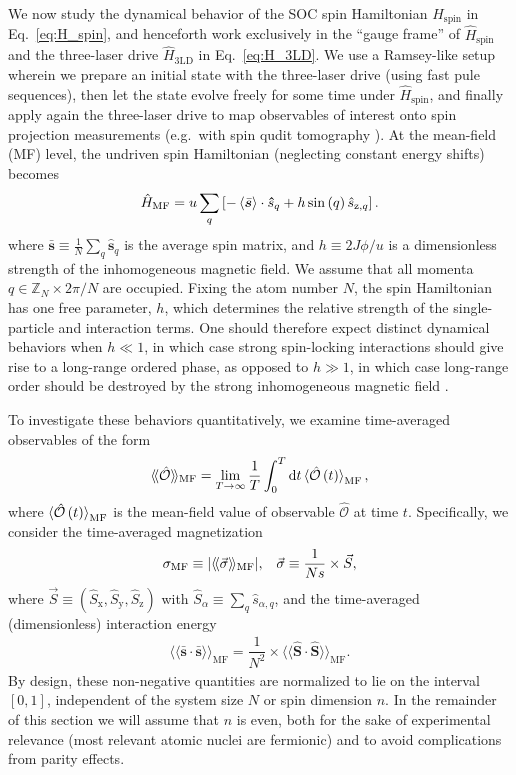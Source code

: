 \documentclass[aps,pra,nofootinbib,twocolumn,superscriptaddress]{revtex4-2}
\renewcommand{\t}{\text} %
\newcommand{\f}[2]{\dfrac{#1}{#2}} %
\newcommand{\p}[1]{\left(#1\right)} %
\renewcommand{\sp}[1]{\left[#1\right]} %
\newcommand{\bk}{\braket} %
\renewcommand{\v}{\bm} %
\renewcommand{\dd}{\text{d}} %
\newcommand{\bbk}[1]{\langle\!\langle #1 \rangle\!\rangle}
\newcommand{\1}{\mathds{1}}
\newcommand{\s}{\hat s}
\renewcommand{\H}{\hat H}
\renewcommand{\S}{\hat S}
\renewcommand{\O}{\hat{\mathcal{O}}}
\newcommand{\x}{\text{x}}
\newcommand{\y}{\text{y}}
\newcommand{\z}{\text{z}}
\newcommand{\ZZ}{\mathbb{Z}}
\newcommand{\spin}{\text{spin}}
\newcommand{\MF}{\text{MF}}
\newcommand{\sds}{\bar{\v s}\cdot\bar{\v s}}
\begin{document}
We now study the dynamical behavior of the SOC spin Hamiltonian $H_\spin$ in Eq.~\eqref{eq:H_spin}, and henceforth work exclusively in the ``gauge frame'' of $\H_\spin$ and the three-laser drive $\H_{\t{3LD}}$ in Eq.~\eqref{eq:H_3LD}.
We use a Ramsey-like setup wherein we prepare an initial state with the three-laser drive (using fast pule sequences), then let the state evolve freely for some time under $\H_\spin$, and finally apply again the three-laser drive to map observables of interest onto spin projection measurements (e.g.~with spin qudit tomography \cite{newton1968measurability, perlin2020qudit}).
At the mean-field (MF) level, the undriven spin Hamiltonian (neglecting constant energy shifts) becomes
\begin{align}
  \H_\MF = u \sum_q\sp{-\bk{\bar{\v s}}\cdot\v\s_q
    + h \sin\p{q} \s_{\z,q}}.
  \label{eq:H_MF}
\end{align}
where $\bar{\v s}\equiv\frac1N\sum_q\v\s_q$ is the average spin matrix, and $h\equiv 2J\phi/u$ is a dimensionless strength of the inhomogeneous magnetic field.
We assume that all momenta $q\in\ZZ_N\times 2\pi/N$ are occupied.
Fixing the atom number $N$, the spin Hamiltonian has one free parameter, $h$, which determines the relative strength of the single-particle and interaction terms.
One should therefore expect distinct dynamical behaviors when $h\ll1$, in which case strong spin-locking interactions should give rise to a long-range ordered phase, as opposed to $h\gg1$, in which case long-range order should be destroyed by the strong inhomogeneous magnetic field \cite{smale2019observation}.

To investigate these behaviors quantitatively, we examine time-averaged observables of the form
\begin{align}
  \bbk{\O}_\MF = \lim_{T\to\infty} \f1T \int_0^T \dd t \bk{\O\p{t}}_\MF,
\end{align}
where $\bk{\O\p{t}}_\MF$ is the mean-field value of observable $\O$ at time $t$.
Specifically, we consider the time-averaged magnetization
\begin{align}
  \sigma_\MF \equiv \abs{\bbk{\vec\sigma}_\MF},
  &&
  \vec\sigma \equiv \f1{Ns} \times \vec S,
\end{align}
where $\vec S\equiv(\S_\x,\S_\y,\S_\z)$ with $\S_\alpha \equiv \sum_q \s_{\alpha,q}$, and the time-averaged (dimensionless) interaction energy
\begin{align}
  \bbk{\sds}_\MF = \f1{N^2} \times \bbk{\v\S\cdot\v\S}_\MF.
\end{align}
By design, these non-negative quantities are normalized to lie on the interval $[0,1]$, independent of the system size $N$ or spin dimension $n$.
In the remainder of this section we will assume that $n$ is even, both for the sake of experimental relevance (most relevant atomic nuclei are fermionic) and to avoid complications from parity effects.
\end{document}
